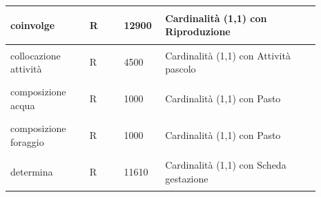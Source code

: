 \documentclass[12pt,a4paper]{article}
\begin{document}
\begin{center}
\begin{longtable}{|p{0.23\linewidth}|p{0.1\linewidth}|p{0.11\linewidth}|p{0.45\linewidth}|}
\hline
coinvolge 				& \begin{center}
\vspace{-25pt}R
\end{center}
					& \begin{center}
					\vspace{-25pt}12900\end{center}
					&  Cardinalità (1,1) con Riproduzione \\ 

\hline
collocazione attività 				& \begin{center}
\vspace{-25pt}R
\end{center}
					& \begin{center}
					\vspace{-25pt}4500\end{center}
					&  Cardinalità (1,1) con Attività pascolo \\ 

\hline
composizione acqua 				& \begin{center}
\vspace{-25pt}R
\end{center}
					& \begin{center}
					\vspace{-25pt}1000\end{center}
					&  Cardinalità (1,1) con Pasto \\ 

\hline
composizione foraggio 				& \begin{center}
\vspace{-25pt}R
\end{center}
					& \begin{center}
					\vspace{-25pt}1000\end{center}
					&  Cardinalità (1,1) con Pasto \\ 


\hline
determina 				& \begin{center}
\vspace{-25pt}R
\end{center}
					& \begin{center}
					\vspace{-25pt}11610\end{center}
					&  Cardinalità (1,1) con Scheda gestazione \\ 


\end{longtable}
\end{center}
\end{document}
